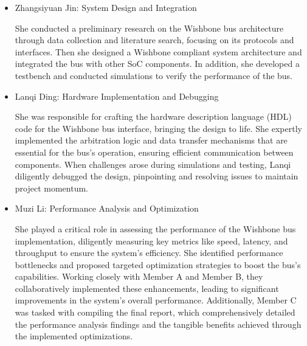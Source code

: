 \documentclass[conference]{IEEEtran}
\begin{document}
\begin{itemize}
    \item Zhangsiyuan Jin: System Design and Integration

    She conducted a preliminary research on the Wishbone bus architecture through data collection and literature search, focusing on its protocols and interfaces. Then she designed a Wishbone compliant system architecture and integrated the bus with other SoC components. In addition, she developed a testbench and conducted simulations to verify the performance of the bus.

    \item Lanqi Ding: Hardware Implementation and Debugging

    She was responsible for crafting the hardware description language (HDL) code for the Wishbone bus interface, bringing the design to life. She expertly implemented the arbitration logic and data transfer mechanisms that are essential for the bus's operation, ensuring efficient communication between components. When challenges arose during simulations and testing, Lanqi diligently debugged the design, pinpointing and resolving issues to maintain project momentum. 

    \item Muzi Li: Performance Analysis and Optimization

    She played a critical role in assessing the performance of the Wishbone bus implementation, diligently measuring key metrics like speed, latency, and throughput to ensure the system's efficiency. She identified performance bottlenecks and proposed targeted optimization strategies to boost the bus's capabilities. Working closely with Member A and Member B, they collaboratively implemented these enhancements, leading to significant improvements in the system's overall performance. Additionally, Member C was tasked with compiling the final report, which comprehensively detailed the performance analysis findings and the tangible benefits achieved through the implemented optimizations.

\end{itemize}
\end{document}

